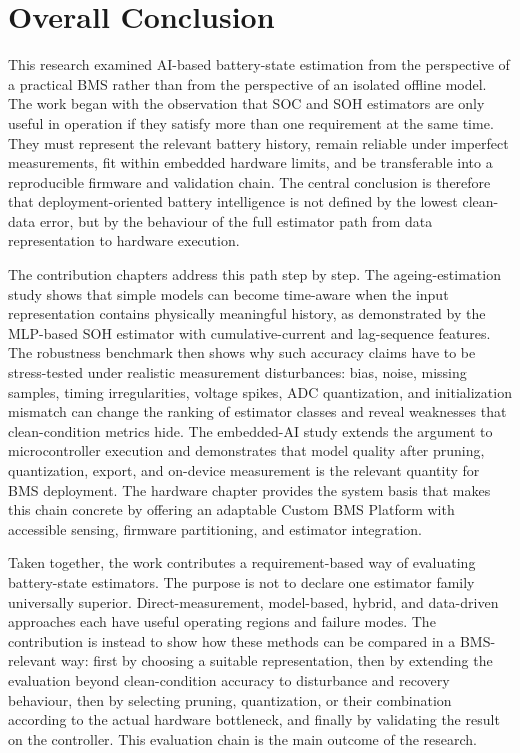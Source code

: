 \documentclass[
    a4paper,
    12pt,
    titlepage,
    bibliography=totoc,
    twoside=on,
    parskip=false,
    numbers=noenddot,
    cleardoublepage=empty,
    DIV=12,
    BCOR=12.0mm,
    headheight=36pt,
    headings=openright
]{scrreprt}
\begin{document}
\section{Overall Conclusion}
This research examined AI-based battery-state estimation from the perspective of a practical BMS rather than from the perspective of an isolated offline model. The work began with the observation that SOC and SOH estimators are only useful in operation if they satisfy more than one requirement at the same time. They must represent the relevant battery history, remain reliable under imperfect measurements, fit within embedded hardware limits, and be transferable into a reproducible firmware and validation chain. The central conclusion is therefore that deployment-oriented battery intelligence is not defined by the lowest clean-data error, but by the behaviour of the full estimator path from data representation to hardware execution.

The contribution chapters address this path step by step. The ageing-estimation study shows that simple models can become time-aware when the input representation contains physically meaningful history, as demonstrated by the MLP-based SOH estimator with cumulative-current and lag-sequence features. The robustness benchmark then shows why such accuracy claims have to be stress-tested under realistic measurement disturbances: bias, noise, missing samples, timing irregularities, voltage spikes, ADC quantization, and initialization mismatch can change the ranking of estimator classes and reveal weaknesses that clean-condition metrics hide. The embedded-AI study extends the argument to microcontroller execution and demonstrates that model quality after pruning, quantization, export, and on-device measurement is the relevant quantity for BMS deployment. The hardware chapter provides the system basis that makes this chain concrete by offering an adaptable Custom BMS Platform with accessible sensing, firmware partitioning, and estimator integration.

Taken together, the work contributes a requirement-based way of evaluating battery-state estimators. The purpose is not to declare one estimator family universally superior. Direct-measurement, model-based, hybrid, and data-driven approaches each have useful operating regions and failure modes. The contribution is instead to show how these methods can be compared in a BMS-relevant way: first by choosing a suitable representation, then by extending the evaluation beyond clean-condition accuracy to disturbance and recovery behaviour, then by selecting pruning, quantization, or their combination according to the actual hardware bottleneck, and finally by validating the result on the controller. This evaluation chain is the main outcome of the research.
\end{document}
